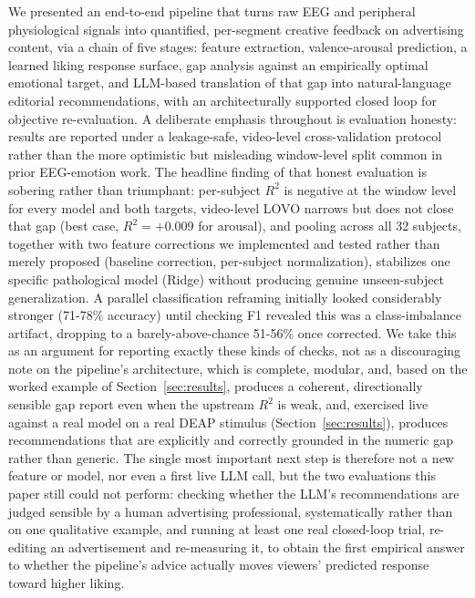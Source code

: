 \documentclass[conference]{IEEEtran}
\begin{document}
We presented an end-to-end pipeline that turns raw EEG and
peripheral physiological signals into quantified, per-segment creative
feedback on advertising content, via a chain of five stages: feature
extraction, valence-arousal prediction, a learned liking response
surface, gap analysis against an empirically optimal emotional target,
and LLM-based translation of that gap into natural-language editorial
recommendations, with an architecturally supported closed loop for
objective re-evaluation. A deliberate emphasis throughout is evaluation
honesty: results are reported under a leakage-safe, video-level
cross-validation protocol rather than the more optimistic but misleading
window-level split common in prior EEG-emotion work. The headline finding
of that honest evaluation is sobering rather than triumphant: per-subject
$R^2$ is negative at the window level for every model and both targets,
video-level LOVO narrows but does not close that gap (best case,
$R^2=+0.009$ for arousal), and pooling across all 32 subjects, together
with two feature corrections we implemented and tested rather than merely
proposed (baseline correction, per-subject normalization), stabilizes one
specific pathological model (Ridge) without producing genuine unseen-subject
generalization. A parallel classification reframing initially looked
considerably stronger (71-78\% accuracy) until checking F1 revealed this
was a class-imbalance artifact, dropping to a barely-above-chance 51-56\%
once corrected. We take this as an argument for reporting exactly these
kinds of checks, not as a discouraging note on the pipeline's architecture,
which is complete, modular, and, based on the worked example of
Section~\ref{sec:results}, produces a coherent, directionally sensible gap
report even when the upstream $R^2$ is weak, and, exercised live against
a real model on a real DEAP stimulus (Section~\ref{sec:results}),
produces recommendations that are explicitly and correctly grounded in
the numeric gap rather than generic. The single most important next step
is therefore not a new feature or model, nor even a first live LLM call,
but the two evaluations this paper still could not perform: checking
whether the LLM's recommendations are judged sensible by a human
advertising professional, systematically rather than on one qualitative
example, and running at least one real closed-loop trial, re-editing an
advertisement and re-measuring it, to obtain the first empirical answer
to whether the pipeline's advice actually moves viewers' predicted
response toward higher liking.
\end{document}

